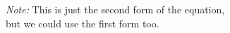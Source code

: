 \documentclass[preview]{standalone}
\begin{document}
\begin{center}
\raggedright
                \textit{Note: } This is just the second form of the equation, \\
                but we could use the first form too.
\end{center}
\end{document}
